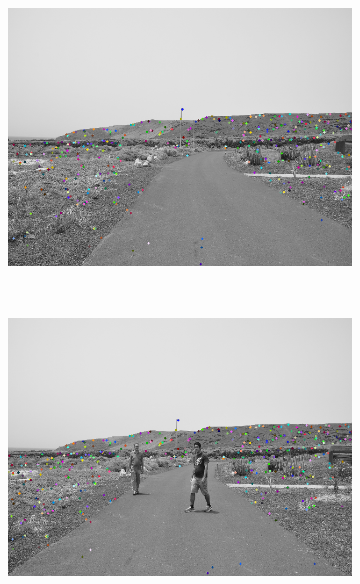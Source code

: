 \begin{figure}[h!]
        \centering
        \begin{subfigure}[b]{0.24\columnwidth}
	    \includegraphics[width=\textwidth]{pipeline/fig5}\label{fig:pipelineA_1}
        \end{subfigure}%
        ~
        \begin{subfigure}[b]{0.24\columnwidth}
	    \includegraphics[width=\textwidth]{pipeline/fig4}\label{fig:pipelineA_2}
        \end{subfigure}%
        ~
        \begin{subfigure}[b]{0.24\columnwidth}

\end{subfigure}
\end{figure}
